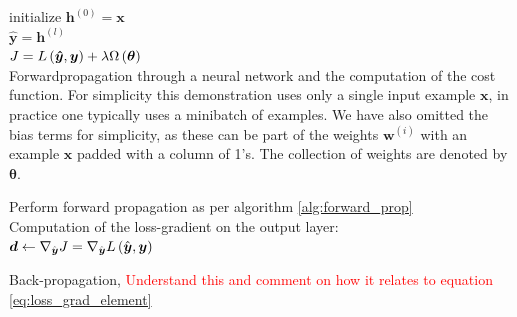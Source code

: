 \begin{algorithm}\label{alg:forward_prop}
\SetAlgoLined
{}
 initialize $\boldsymbol{h}^{(0)} = \boldsymbol{x}$ \\
$\hat{\boldsymbol{y}} = \boldsymbol{h}^{(l)}$ \\
$J = L\left (\boldsymbol{\hat{y}}, \boldsymbol{y}\right) + \lambda \Omega \left (\boldsymbol{\theta}\right)$ \\
 \caption{Forwardpropagation through a neural network and the computation of the cost function. For simplicity this demonstration uses only a single input example $\boldsymbol{x}$, in practice one typically uses a minibatch of examples. We have also omitted the bias terms for simplicity, as these can be part of the weights $\boldsymbol{w}^{(i)}$ with an example $\boldsymbol{x}$ padded with a column of 1's. The collection of weights are denoted by $\boldsymbol{\theta}$.}
\end{algorithm}

\begin{algorithm}\label{alg:back_prop}
\SetAlgoLined
{}
Perform forward propagation as per algorithm \ref{alg:forward_prop}\\
Computation of the loss-gradient on the output layer:\\
$\boldsymbol{d} \leftarrow \nabla_{\hat{\boldsymbol{y}}} J =  \nabla_{\hat{\boldsymbol{y}}} L\left (\hat{\boldsymbol{y}}, \boldsymbol{y}\right)$ \\
\caption{Back-propagation, \textcolor{red}{Understand this and comment on how it relates to equation \ref{eq:loss_grad_element}}}
\end{algorithm}

